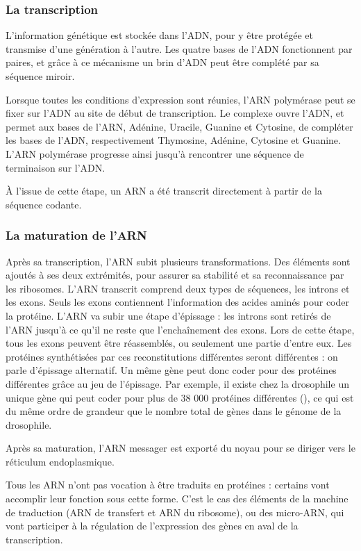 \subsubsection{La transcription}

L'information génétique est stockée dans l'ADN, pour y être protégée et transmise d'une génération à l'autre. Les quatre bases de l'ADN fonctionnent par paires, et grâce à ce mécanisme un brin d'ADN peut être complété par sa séquence miroir. 

Lorsque toutes les conditions d'expression sont réunies, l'ARN polymérase peut se fixer sur l'ADN au site de début de transcription. Le complexe ouvre l'ADN, et permet aux bases de l'ARN, Adénine, Uracile, Guanine et Cytosine, de compléter les bases de l'ADN, respectivement Thymosine, Adénine, Cytosine et Guanine. L'ARN polymérase progresse ainsi jusqu'à rencontrer une séquence de terminaison sur l'ADN. 

À l'issue de cette étape, un ARN a été transcrit directement à partir de la séquence codante. 

\subsubsection{La maturation de l'ARN}

Après sa transcription, l'ARN subit plusieurs transformations. Des éléments sont ajoutés à ses deux extrémités, pour assurer sa stabilité et sa reconnaissance par les ribosomes. 
L'ARN transcrit comprend deux types de séquences, les introns et les exons. Seuls les exons contiennent l'information des acides aminés pour coder la protéine. 
L'ARN va subir une étape d'épissage : les introns sont retirés de l'ARN jusqu'à ce qu'il ne reste que l'enchaînement des exons. Lors de cette étape, tous les exons peuvent être réassemblés, ou seulement une partie d'entre eux. Les protéines synthétisées par ces reconstitutions différentes seront différentes : on parle d'épissage alternatif. 
Un même gène peut donc coder pour des protéines différentes grâce au jeu de l'épissage. Par exemple, il existe chez la drosophile un unique gène qui peut coder pour plus de 38 000 protéines différentes (\cite{schmucker_drosophila_2000}), ce qui est du même ordre de grandeur que le nombre total de gènes dans le génome de la drosophile. 

Après sa maturation, l'ARN messager est exporté du noyau pour se diriger vers le réticulum endoplasmique.

Tous les ARN n'ont pas vocation à être traduits en protéines : certains vont accomplir leur fonction sous cette forme. C'est le cas des éléments de la machine de traduction (ARN de transfert et ARN du ribosome), ou des micro-ARN, qui vont participer à la régulation de l'expression des gènes en aval de la transcription.

